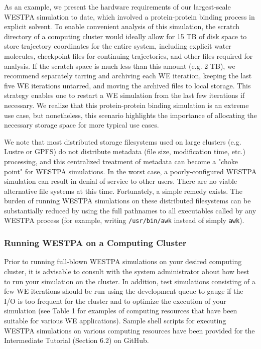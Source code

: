 \documentclass[9pt,tutorial,ASAPversion]{livecoms}
\begin{document}
As an example, we present the hardware requirements of our largest-scale WESTPA simulation to date, which involved a protein-protein binding process in explicit solvent. 
To enable convenient analysis of this simulation, the scratch directory of a computing cluster would ideally allow for 15 TB of disk space to store trajectory coordinates for the entire system, including explicit water molecules, checkpoint files for continuing trajectories, and other files required for analysis. 
If the scratch space is much less than this amount (e.g. 2 TB), we recommend separately tarring and archiving each WE iteration, keeping the last five WE iterations untarred, and moving the archived files to local storage. 
This strategy enables one to restart a WE simulation from the last few iterations if necessary. 
We realize that this protein-protein binding simulation is an extreme use case, but nonetheless, this scenario highlights the importance of allocating the necessary storage space for more typical use cases. 

We note that most distributed storage filesystems used on large clusters (e.g. Lustre or GPFS) do not distribute metadata (file size, modification time, etc.) processing, and this centralized treatment of metadata can become a "choke point" for WESTPA simulations. 
In the worst case, a poorly-configured WESTPA simulation can result in denial of service to other users. 
There are no viable alternative file systems at this time. 
Fortunately, a simple remedy exists. The burden of running WESTPA simulations on these distributed filesystems can be substantially reduced by using the full pathnames to all executables called by any WESTPA process (for example, writing \verb|/usr/bin/awk| instead of simply \verb|awk|).

\subsubsection{Running WESTPA on a Computing Cluster}

Prior to running full-blown WESTPA simulations on your desired computing cluster, it is advisable to consult with the system administrator about how best to run your simulation on the cluster. 
In addition, test simulations consisting of a few WE iterations should be run using the development queue to gauge if the I/O is too frequent for the cluster and to optimize the execution of your simulation (see Table 1 for examples of computing resources that have been suitable for various WE applications). 
Sample shell scripts for executing WESTPA simulations on various computing resources have been provided for the Intermediate Tutorial (Section 6.2) on GitHub. 
\end{document}
